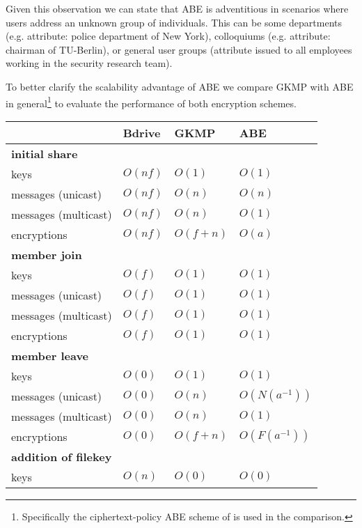 Given this observation we can state that \ac{ABE} is adventitious in scenarios where users address an unknown group of individuals. This can be some departments (e.g. attribute: police department of New York), colloquiums (e.g. attribute: chairman of TU-Berlin), or general user groups (attribute issued to all employees working in the security research team).

To better clarify the scalability advantage of \ac{ABE} we compare GKMP with ABE in general\footnote{Specifically the ciphertext-policy ABE scheme of \cite{bethencourt2007ciphertext} is used in the comparison.} to evaluate the performance of both encryption schemes.

\begin{table*}[!ht]
\centering
\begin{tabular}{l 		| l 						| l 						| l }
 						& \textbf{Bdrive}			& \textbf{\ac{GKMP}} 			& \textbf{\ac{ABE}} 		\\
\hline
\textbf{initial share} 																				\\
keys 					& $O(nf)$ 					& $O(1)$	 				& $O(1)$			\\
messages (unicast)		& $O(nf)$  					& $O(n)$					& $O(n)$			\\
messages (multicast) 	& $O(nf)$ 					& $O(n)$ 					& $O(1)$			\\
encryptions				& $O(nf)$ 					& $O(f + n)$				& $O(a)$ 			\\
\hline
\textbf{member join} 																				\\
keys 					& $O(f)$   					& $O(1)$					& $O(1)$			\\
messages (unicast)		& $O(f)$  					& $O(1)$  					& $O(1)$ 			\\
messages (multicast) 	& $O(f)$ 	 				& $O(1)$					& $O(1)$ 			\\
encryptions				& $O(f)$  					& $O(1)$					& $O(1)$ 			\\
\hline
\textbf{member leave}																				\\
keys 					& $O(0)$					& $O(1)$					& $O(1)$			\\
messages (unicast)		& $O(0)$					& $O(n)$  					& $O(N(a^{-1}))$	\\
messages (multicast)	& $O(0)$					& $O(n)$					& $O(1)$ 			\\ 
encryptions 			& $O(0)$					& $O(f + n)$ 				& $O(F(a^{-1}))$	\\
\hline	
\textbf{addition of filekey}																		\\
keys 					& $O(n)$	 				& $O(0)$					& $O(0)$			\\

\end{tabular}
\end{table*}
